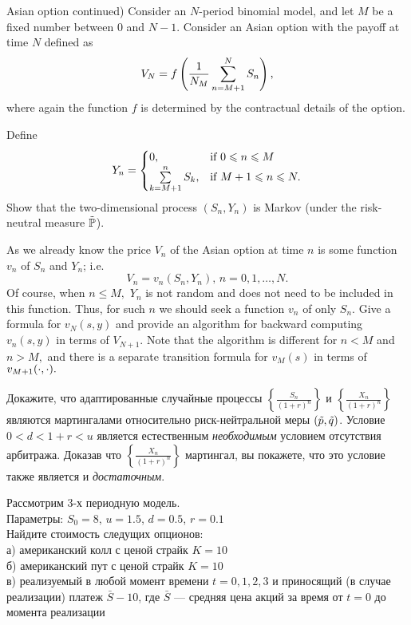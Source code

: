 \begin{problem}
 Asian option continued) Consider an $N$-period binomial model,
and let $M$ be a fixed number between $0$ and $N-1$. Consider an Asian option with the payoff
at time $N$ defined as
\[
V_N=f\left(\frac{1}{N_M}\sum\lims_{n=M+1}^{N} S_n \right),
\]
\ni where again the function $f$ is determined by the contractual details of the option.

Define
\[
Y_n=
\begin{cases}
0,&\text{if }0\le n\le M\\
\sum\lims_{k=M+1}^{n} S_k,&\text{if }M+1\le n\le N.
\end{cases}
\]
\ni Show that the two-dimensional process $(S_n,Y_n)$ is Markov
(under the risk-neutral measure $\tilde{\P}$).

As we already know the price $V_n$ of the Asian option at time $n$
is some function $v_n$ of $S_n$ and $Y_n$; i.e.
\[
V_n=v_n(S_n,Y_n),\, n=0,1,\dots,N.
\]
\ni Of course, when $n\le M,$ $Y_n$ is not random and does not need to be included
in this function. Thus, for such $n$ we should seek a function $v_n$ of only $S_n$.
\ni Give a formula for $v_N(s,y)$ and provide an algorithm for backward computing
$v_n(s,y)$ in terms of $V_{N+1}.$ Note that the algorithm is different for $n<M$
and $n>M,$ and there is a separate transition formula for $v_M(s)$ in terms of
$v_{M+1}(\cd,\cd).$
\end{problem} 
\begin{solution} 

\end{solution}

\begin{problem}
 Докажите, что адаптированные случайные процессы $\left\{ \frac{S_n}{(1+r)^n}\right\}$ и
  $\left\{ \frac{X_n}{(1+r)^n}\right\}$ являются мартингалами относительно риск-нейтральной 
  меры $(\ti p, \ti q)$. Условие $0<d<1+r<u$ является естественным \emph{необходимым} условием 
  отсутствия арбитража. Доказав что $\left\{ \frac{X_n}{(1+r)^n}\right\}$ мартингал, вы покажете, 
  что это условие также является и \emph{достаточным}.
\end{problem} 
\begin{solution} 

\end{solution}

\begin{problem}
Рассмотрим 3-х периодную модель.\\
Параметры: $S_{0}=8$, $u=1.5$, $d=0.5$, $r=0.1$ \\
Найдите стоимость следущих опционов: \\
а) американский колл с ценой страйк $K=10$ \\
б) американский пут с ценой страйк $K=10$ \\
в) реализуемый в любой момент времени $t=0,1,2,3$ и приносящий (в случае реализации) платеж $\bar{S}-10$, где $\bar{S}$ --- средняя цена акций за время от $t=0$ до момента реализации 
\end{problem} 
\begin{solution} 

\end{solution}


